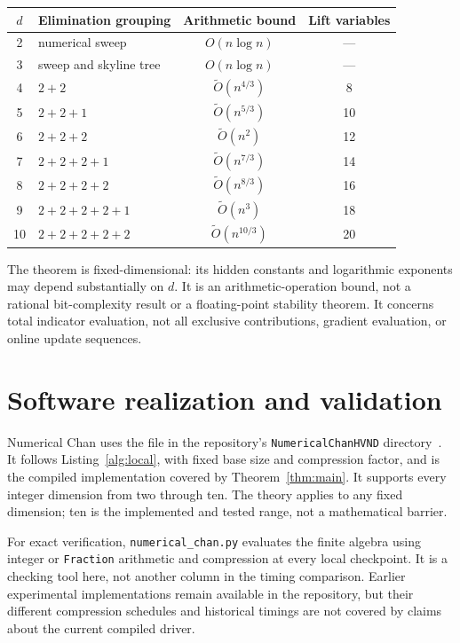 \documentclass[12pt,a4paper]{article}
\theoremstyle{definition}
\newcommand{\wtO}{\widetilde O}
\begin{document}
\begin{center}
\begin{tabular}{@{}clcc@{}}
\toprule
$d$ & Elimination grouping & Arithmetic bound & Lift variables\\\midrule
2 & numerical sweep & $O(n\log n)$ & ---\\
3 & sweep and skyline tree & $O(n\log n)$ & ---\\
4 & $2+2$ & $\wtO(n^{4/3})$ & 8\\
5 & $2+2+1$ & $\wtO(n^{5/3})$ & 10\\
6 & $2+2+2$ & $\wtO(n^2)$ & 12\\
7 & $2+2+2+1$ & $\wtO(n^{7/3})$ & 14\\
8 & $2+2+2+2$ & $\wtO(n^{8/3})$ & 16\\
9 & $2+2+2+2+1$ & $\wtO(n^3)$ & 18\\
10 & $2+2+2+2+2$ & $\wtO(n^{10/3})$ & 20\\
\bottomrule
\end{tabular}
\end{center}
The theorem is fixed-dimensional: its hidden constants and logarithmic
exponents may depend substantially on $d$. It is an arithmetic-operation
bound, not a rational bit-complexity result or a floating-point stability
theorem. It concerns total indicator evaluation, not all exclusive
contributions, gradient evaluation, or online update sequences.

\section{Software realization and validation}
\label{sec:software}

Numerical Chan uses the file
in the repository's \texttt{NumericalChanHVND} directory~\cite{software}.
It follows Listing~\ref{alg:local}, with fixed
base size and compression factor, and is the compiled implementation
covered by Theorem~\ref{thm:main}. It supports every integer dimension
from two through ten. The theory applies to any fixed dimension; ten
is the implemented and tested range, not a mathematical barrier.

For exact verification, \texttt{numerical\_chan.py} evaluates the finite
algebra using integer or \texttt{Fraction} arithmetic and compression
at every local checkpoint. It is a checking tool here, not another
column in the timing comparison. Earlier experimental implementations
remain available in the repository, but their different compression
schedules and historical timings are not covered by claims about the
current compiled driver.
\end{document}
